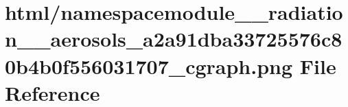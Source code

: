 \hypertarget{namespacemodule____radiation____aerosols__a2a91dba33725576c80b4b0f556031707__cgraph_8png}{}\section{html/namespacemodule\+\_\+\+\_\+radiation\+\_\+\+\_\+aerosols\+\_\+a2a91dba33725576c80b4b0f556031707\+\_\+cgraph.png File Reference}
\label{namespacemodule____radiation____aerosols__a2a91dba33725576c80b4b0f556031707__cgraph_8png}

